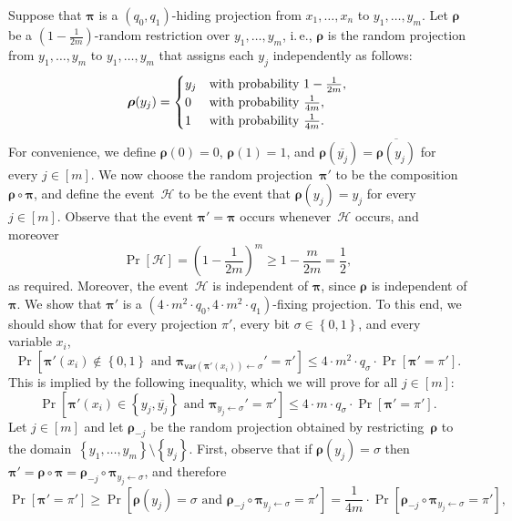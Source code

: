 \documentclass[11pt]{article}
\numberwithin{equation}{section}
\theoremstyle{definition}
\theoremstyle{plain}
\newcommand{\ie}{i.\,e.}
\theoremstyle{definition}\newtheorem{notation}[theorem]{Notation}\theoremstyle{plain}
\newcommand{\B}{\left\{ 0,1 \right \}}
\newcommand{\p}{\boldsymbol{\pi}}
\newcommand{\cH}{\mathcal{H}}
\newcommand{\rs}{\boldsymbol{\rho}}
\newcommand{\var}{\mathsf{var}}
\theoremstyle{definition}
\theoremstyle{plain}
\begin{document}
Suppose that $\p$ is a $(q_{0},q_{1})$-hiding projection from $x_{1},\ldots,x_{n}$
to $y_{1},\ldots,y_{m}$. Let $\rs$ be a $\left(1-\frac{1}{2m}\right)$-random
restriction over $y_{1},\ldots,y_{m}$, \ie, $\rs$ is the random
projection from $y_{1},\ldots,y_{m}$ to $y_{1},\ldots,y_{m}$ that
assigns each $y_{j}$ independently as follows: 
\[
\rs(y_{j})=\begin{cases}
y_{j} & \text{with probability \ensuremath{1-\frac{1}{2m}}},\\
0 & \text{with probability \ensuremath{\frac{1}{4m}}},\\
1 & \text{with probability \ensuremath{\frac{1}{4m}}}.
\end{cases}
\]
For convenience, we define $\rs(0)=0$, $\rs(1)=1$, and $\rs(\overline{y_{j}})=\overline{\rs(y_{j})}$
for every $j\in\left[m\right]$. We now choose the random projection~$\p'$
to be the composition~$\rs\circ\p$, and define the event~$\cH$
to be the event that $\rs(y_{j})=y_{j}$ for every $j\in\left[m\right]$.
Observe that the event $\p'=\p$ occurs whenever~$\cH$ occurs, and
moreover 
\[
\Pr\!\left[\cH\right]=\left(1-\frac{1}{2m}\right)^{m}\ge1-\frac{m}{2m}=\frac{1}{2},
\]
as required. Moreover, the event~$\cH$ is independent of $\p$,
since $\rs$ is independent of $\p$. We show that $\p'$ is a $(4\cdot m^{2}\cdot q_{0},4\cdot m^{2}\cdot q_{1})$-fixing
projection. To this end, we should show that for every projection
$\pi'$, every bit $\sigma\in\B$, and every variable $x_{i}$, 
\begin{equation}
\Pr\!\left[\p'(x_{i})\notin\B\text{ and }\p_{\var(\p'(x_{i}))\gets\sigma}'=\pi'\right]\leq4\cdot m^{2}\cdot q_{\sigma}\cdot\Pr\!\left[\p'=\pi'\right].\label{eq:shrinkage-hiding-goal-after-summation}
\end{equation}
This is implied by the following inequality, which we will prove for
all $j\in\left[m\right]$: 
\begin{equation}
\Pr\!\left[\p'(x_{i})\in\left\{ y_{j},\overline{y_{j}}\right\} \text{ and }\p_{y_{j}\gets\sigma}'=\pi'\right]\leq4\cdot m\cdot q_{\sigma}\cdot\Pr\!\left[\p'=\pi'\right].\label{eq:shrinkage-hiding-goal}
\end{equation}
Let $j\in\left[m\right]$ and let $\rs_{-j}$ be the random projection
obtained by restricting~$\rs$ to the domain~$\left\{ y_{1},\ldots,y_{m}\right\} \setminus\left\{ y_{j}\right\} $.
First, observe that if $\rs(y_{j})=\sigma$ then $\p'=\rs\circ\p=\rs_{-j}\circ\p_{y_{j}\gets\sigma}$,
and therefore 
\[
\Pr\!\left[\p'=\pi'\right]\geq\Pr\!\left[\rs(y_{j})=\sigma\text{ and }\rs_{-j}\circ\p_{y_{j}\gets\sigma}=\pi'\right]=\frac{1}{4m}\cdot\Pr\!\left[\rs_{-j}\circ\p_{y_{j}\gets\sigma}=\pi'\right],
\]
\end{document}

